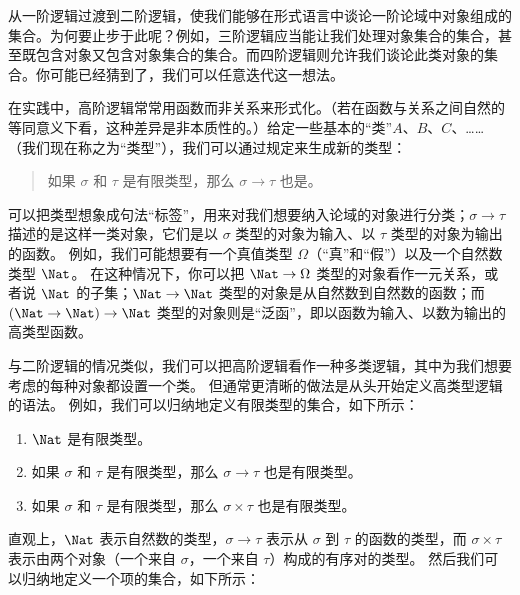 \documentclass[../../../include/open-logic-section]{subfiles}
\begin{document}


从一阶逻辑过渡到二阶逻辑，使我们能够在形式语言中谈论一阶论域中对象组成的集合。为何要止步于此呢？例如，三阶逻辑应当能让我们处理对象集合的集合，甚至既包含对象又包含对象集合的集合。而四阶逻辑则允许我们谈论此类对象的集合。你可能已经猜到了，我们可以任意迭代这一想法。

在实践中，高阶逻辑常常用函数而非关系来形式化。（若在函数与关系之间自然的等同意义下看，这种差异是非本质性的。）给定一些基本的“类”$A$、$B$、$C$、……（我们现在称之为“类型”），我们可以通过规定来生成新的类型：

\begin{quote}
如果 $\sigma$ 和 $\tau$ 是有限类型，那么 $\sigma \to \tau$ 也是。
\end{quote}

可以把类型想象成句法“标签”，用来对我们想要纳入论域的对象进行分类；$\sigma \to \tau$ 描述的是这样一类对象，它们是以 $\sigma$ 类型的对象为输入、以 $\tau$ 类型的对象为输出的函数。
例如，我们可能想要有一个真值类型 $\Omega$（“真”和“假”）以及一个自然数类型 $\Nat$。
在这种情况下，你可以把 $\Nat \to \Omega$ 类型的对象看作一元关系，或者说 $\Nat$ 的子集；$\Nat \to \Nat$ 类型的对象是从自然数到自然数的函数；而 $(\Nat \to \Nat) \to \Nat$ 类型的对象则是“泛函”，即以函数为输入、以数为输出的高类型函数。

与二阶逻辑的情况类似，我们可以把高阶逻辑看作一种多类逻辑，其中为我们想要考虑的每种对象都设置一个类。
但通常更清晰的做法是从头开始定义高类型逻辑的语法。
例如，我们可以归纳地定义有限类型的集合，如下所示：

\begin{enumerate}
\item $\Nat$ 是有限类型。
\item 如果 $\sigma$ 和 $\tau$ 是有限类型，那么 $\sigma \to \tau$ 也是有限类型。
\item 如果 $\sigma$ 和 $\tau$ 是有限类型，那么 $\sigma \times \tau$ 也是有限类型。
\end{enumerate}

直观上，$\Nat$ 表示自然数的类型，$\sigma \to \tau$ 表示从 $\sigma$ 到 $\tau$ 的函数的类型，而 $\sigma \times \tau$ 表示由两个对象（一个来自 $\sigma$，一个来自 $\tau$）构成的有序对的类型。
然后我们可以归纳地定义一个项的集合，如下所示：
\end{document}

